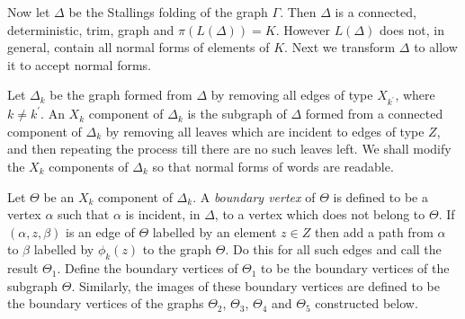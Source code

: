\documentclass[a4paper,12pt]{article}
\renewcommand{\a}{\alpha }
\renewcommand{\b}{\beta }
\newcommand{\G}{\Gamma }
\newcommand{\D}{\Delta }
\newcommand{\T}{\Theta }
\newtheorem{lemma}[theorem]{Lemma}
\newtheorem{definition}[theorem]{Definition}
\numberwithin{equation}{section}
\numberwithin{figure}{section}
\newcommand{\be}{\begin{enumerate}}
\newcommand{\ee}{\end{enumerate}}
\begin{document}
Now let $\D$ be the Stallings folding of the graph $\G$.  Then
 $\D$ is a connected, deterministic, trim, graph and $\pi(L(\D))=K$. However
$L(\D)$ does not, in general, contain all normal forms of elements of $K$.
Next we transform $\D$ to allow it to accept normal forms.

Let $\D_k$ be the graph formed from $\D$ by removing all edges of
type $X_{k^\prime}$, where $k\neq k^\prime$. An $X_k$ component of
$\D_k$ is the subgraph of $\D$ formed from a connected component
of $\D_k$ by removing all leaves which are incident to edges of
type $Z$, and then repeating the process till there are no such
leaves left.
 We shall modify the $X_k$ components of $\D_k$ so that normal forms of words
are readable.

Let $\T$ be an $X_k$ component of $\D_k$. A
{\em boundary vertex} of $\T$ is defined to be a vertex
$\a$ such that $\a$ is incident, in $\D$, to a vertex which does not
belong to $\T$.  If $(\a,z,\b)$ is an edge of
$\T$ labelled by an element $z\in Z$ then add a path from $\a$ to
$\b$ labelled by $\phi_k(z)$ to the graph $\T$. Do this for all such edges
and call the result $\T_1$.  Define the boundary vertices of $\T_1$ to be
the boundary vertices of the subgraph $\T$. Similarly, the images of these
boundary vertices are defined to be the boundary vertices of
the graphs $\T_2$, $\T_3$, $\T_4$ and $\T_5$ constructed
below.
\end{document}
